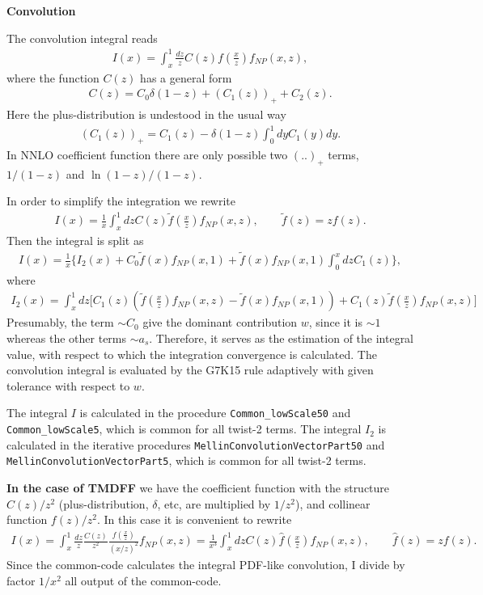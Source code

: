 \documentclass[prd,nofootinbib,eqsecnum,final]{revtex4}
\renewcommand{\(}{\left(}
\renewcommand{\)}{\right)}
\renewcommand{\[}{\left[}
\renewcommand{\]}{\right]}
\begin{document}
\begin{center}
\textbf{Convolution}
\end{center}

The convolution integral reads
\begin{eqnarray}
I(x)=\int_x^1 \frac{dz}{z}C(z)f\(\frac{x}{z}\)f_{NP}(x,z),
\end{eqnarray}
where the function $C(z)$ has a general form
\begin{eqnarray}
C(z)=C_0 \delta(1-z)+\(C_1(z)\)_++C_2(z).
\end{eqnarray}
Here the plus-distribution is undestood in the usual way
\begin{eqnarray}
\(C_1(z)\)_+=C_1(z)-\delta(1-z)\int_0^1 dy C_1(y)dy.
\end{eqnarray}
In NNLO coefficient function there are only possible two $(..)_+$ terms, $1/(1-z)$ and $\ln(1-z)/(1-z)$.

In order to simplify the integration we rewrite
\begin{eqnarray}
I(x)=\frac{1}{x}\int_x^1 dz C(z)\tilde f\(\frac{x}{z}\)f_{NP}(x,z),\qquad \tilde f(z)=zf(z).
\end{eqnarray}
Then the integral is split as
\begin{eqnarray}
I(x)=\frac{1}{x}\Big\{I_2(x)+C_0\tilde f\(x\)f_{NP}(x,1)+\tilde f\(x\)f_{NP}(x,1)\int_0^x dz C_1(z)\Big\},
\end{eqnarray}
where
\begin{eqnarray}
I_2(x)=\int_x^1 dz \Big[C_1(z)\(\tilde f\(\frac{x}{z}\)f_{NP}(x,z)-\tilde f\(x\)f_{NP}(x,1)\)+C_1(z)\tilde f\(\frac{x}{z}\)f_{NP}(x,z)\Big]
\end{eqnarray}
Presumably, the term $\sim C_0$ give the dominant contribution $w$, since it is $\sim 1$ whereas the other terms $\sim a_s$. Therefore, it serves as the estimation of the integral value, with respect to which the integration convergence is calculated. The convolution integral is evaluated by the G7K15 rule adaptively with given tolerance with respect to $w$. 

The integral $I$ is calculated in the procedure \texttt{Common\_lowScale50} and \texttt{Common\_lowScale5}, which is common for all twist-2 terms. The integral $I_2$ is calculated in the iterative procedures \texttt{MellinConvolutionVectorPart50} and \texttt{MellinConvolutionVectorPart5}, which is common for all twist-2 terms. 

\textbf{In the case of TMDFF} we have the coefficient function with the structure $C(z)/z^2$ (plus-distribution, $\delta$, etc, are multiplied by $1/z^2$), and collinear function $f(z)/z^2$. In this case it is convenient to rewrite
\begin{eqnarray}
I(x)=\int_x^1 \frac{dz}{z}\frac{C(z)}{z^2}\frac{f\(\frac{x}{z}\)}{(x/z)^2}f_{NP}(x,z)=\frac{1}{x^3}\int_x^1 dz C(z)\hat f\(\frac{x}{z}\)f_{NP}(x,z),\qquad \hat f(z)=zf(z).
\end{eqnarray}
Since the common-code calculates the integral PDF-like convolution, I divide by factor $1/x^2$ all output of the common-code.
\end{document}

